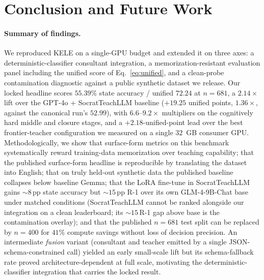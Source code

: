 \documentclass[11pt]{article}
\begin{document}
\section{Conclusion and Future Work}
\label{sec:conclusion}

\paragraph{Summary of findings.} We reproduced KELE on a single-GPU budget and extended it on three axes: a deterministic-classifier consultant integration, a memorization-resistant evaluation panel including the unified score of Eq.~\ref{eq:unified}, and a clean-probe contamination diagnostic against a public synthetic dataset we release. Our locked headline scores $\mathbf{55.39\%}$ state accuracy / unified $\mathbf{72.24}$ at $n{=}681$, a $\mathbf{2.14\times}$ lift over the GPT-4o + SocratTeachLLM baseline ($+19.25$ unified points, $1.36\times$, against the canonical run's $52.99$), with $6.6$--$9.2\times$ multipliers on the cognitively hard middle and closure stages, and a $\mathbf{+2.18}$-unified-point lead over the best frontier-teacher configuration we measured on a single $32$~GB consumer GPU. Methodologically, we show that surface-form metrics on this benchmark systematically reward training-data memorization over teaching capability; that the published surface-form headline is reproducible by translating the dataset into English; that on truly held-out synthetic data the published baseline collapses below baseline Gemma; that the LoRA fine-tune in SocratTeachLLM gains $\sim$$8$\,pp state accuracy but $\sim$$15$\,pp R-1 over its own GLM-4-9B-Chat base under matched conditions (SocratTeachLLM cannot be ranked alongside our integration on a clean leaderboard; its $\sim$$15$\,R-1 gap above base is the contamination overlay); and that the published $n{=}681$ test split can be replaced by $n{=}400$ for $41\%$ compute savings without loss of decision precision. An intermediate \emph{fusion} variant (consultant and teacher emitted by a single JSON-schema-constrained call) yielded an early small-scale lift but its schema-fallback rate proved architecture-dependent at full scale, motivating the deterministic-classifier integration that carries the locked result.
\end{document}
